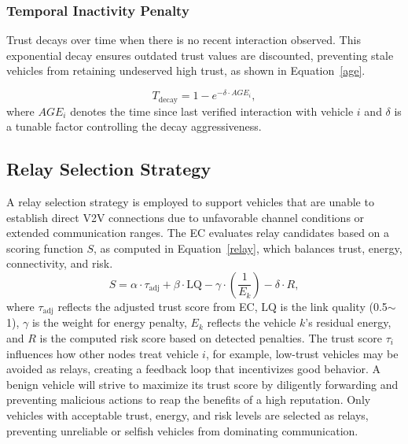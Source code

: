 \cite{cho2010survey}\documentclass[journal,comsoc,twoside]{IEEEtran}
\begin{document}
\subsubsection{Temporal Inactivity Penalty}
Trust decays over time when there is no recent interaction observed. This exponential decay ensures outdated trust values are discounted, preventing stale vehicles from retaining undeserved high trust, as shown in Equation~\ref{age}.

\begin{equation}
\label{age}
T_{\text{decay}} = 1 - e^{-\delta \cdot AGE_i},
\end{equation}
where $AGE_i$ denotes the time since last verified interaction with vehicle $i$ and $\delta$ is a tunable factor controlling the decay aggressiveness.

\subsection{Relay Selection Strategy}
A relay selection strategy is employed to support vehicles that are unable to establish direct V2V connections due to unfavorable channel conditions or extended communication ranges. The EC evaluates relay candidates based on a scoring function $S$, as computed in Equation~\ref{relay}, which balances trust, energy, connectivity, and risk.
\begin{equation}
S = \alpha \cdot \tau_{\text{adj}} + \beta \cdot \text{LQ} - \gamma \cdot \left( \frac{1}{E_k} \right) - \delta \cdot R,
\label{relay}
\end{equation}
where \(\tau_{\text{adj}}\) reflects the adjusted trust score from EC, 
\(\text{LQ}\) is the link quality (0.5$\sim$1), $\gamma$ is the weight for energy penalty, \(E_k\) reflects the vehicle $k$'s residual energy, and \(R\) is the computed risk score based on detected penalties. The trust score $\tau_i$ influences how other nodes treat vehicle $i$, for example, low-trust vehicles may be avoided as relays, creating a feedback loop that incentivizes good behavior. A benign vehicle will strive to maximize its trust score by diligently forwarding and preventing malicious actions to reap the benefits of a high reputation. Only vehicles with acceptable trust, energy, and risk levels are selected as relays, preventing unreliable or selfish vehicles from dominating communication.
\end{document}
